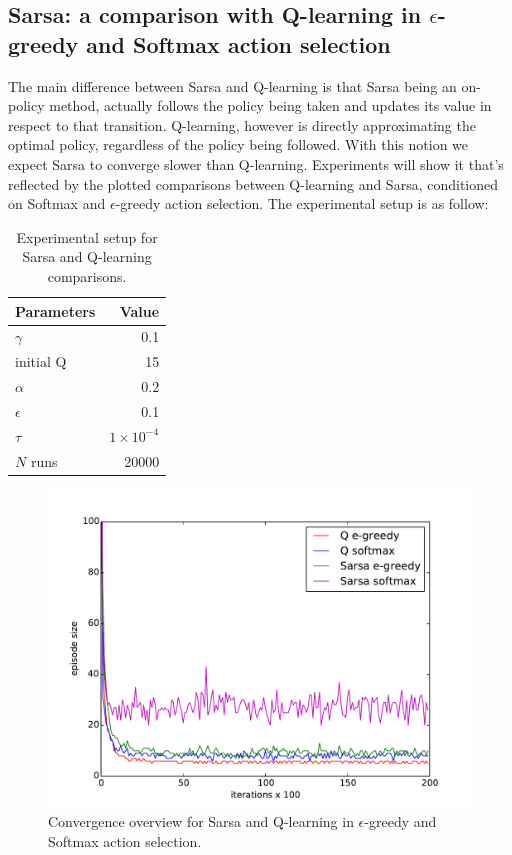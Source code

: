 \documentclass[paper=a4, fontsize=11pt]{scrartcl}
\numberwithin{equation}{section}		%
\numberwithin{figure}{section}			%
\numberwithin{table}{section}				%
\begin{document}
\subsection{Sarsa: a comparison with Q-learning in $\epsilon$-greedy and Softmax action selection}
The main difference between Sarsa and Q-learning is that Sarsa being an on-policy method, actually follows the policy being taken and updates its value in respect to that transition. Q-learning, however is directly approximating the optimal policy, regardless of the policy being followed. With this notion we expect Sarsa to converge slower than Q-learning. Experiments will show it that's reflected by the plotted comparisons between Q-learning and Sarsa, conditioned on Softmax and $\epsilon$-greedy action selection. The experimental setup is as follow:
\begin{table}[H]
\caption{Experimental setup for Sarsa and Q-learning comparisons.}
\centering
\begin{tabular}{|l|r|}
\hline
Parameters & Value \\\hline
$\gamma$ & 0.1 \\\hline
initial Q & 15 \\\hline
$\alpha$ & 0.2\\\hline
$\epsilon$ & 0.1\\\hline
$\tau$ & $1 \times 10^{-4}$\\\hline
$N$ runs & 20000\\\hline
\end{tabular}
\label{expSetupSarsa}
\end{table}
\begin{figure}[H] \centering
\includegraphics[scale=0.5]{sarsaOverview.pdf}
\caption{Convergence overview for Sarsa and Q-learning in $\epsilon$-greedy and Softmax action selection.} 
\label{figure:sarsaOverview}
\end{figure}
\end{document}
